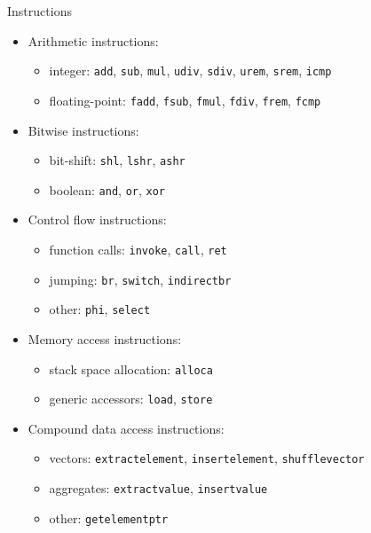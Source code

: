 \documentclass[8pt]{beamer}
\begin{document}
\begin{frame}[fragile]{Instructions}
  \begin{block}{}
    \begin{itemize}
      \item Arithmetic instructions:
        \begin{itemize}
          \item integer: \verb+add+, \verb+sub+, \verb+mul+, \verb+udiv+,
            \verb+sdiv+, \verb+urem+, \verb+srem+, \verb+icmp+
          \item floating-point: \verb+fadd+, \verb+fsub+, \verb+fmul+, \verb+fdiv+,
            \verb+frem+, \verb+fcmp+
        \end{itemize}

      \item Bitwise instructions:
        \begin{itemize}
          \item bit-shift: \verb+shl+, \verb+lshr+, \verb+ashr+
          \item boolean: \verb+and+, \verb+or+, \verb+xor+
        \end{itemize}

      \item Control flow instructions:
        \begin{itemize}
          \item function calls: \verb+invoke+, \verb+call+, \verb+ret+
          \item jumping: \verb+br+, \verb+switch+, \verb+indirectbr+
          \item other: \verb+phi+, \verb+select+
        \end{itemize}

      \item Memory access instructions:
        \begin{itemize}
          \item stack space allocation: \verb+alloca+
          \item generic accessors: \verb+load+, \verb+store+
        \end{itemize}

      \item Compound data access instructions:
        \begin{itemize}
          \item vectors: \verb+extractelement+, \verb+insertelement+, \verb+shufflevector+
          \item aggregates: \verb+extractvalue+, \verb+insertvalue+
          \item other: \verb+getelementptr+
        \end{itemize}


\end{itemize}
\end{block}
\end{frame}
\end{document}
